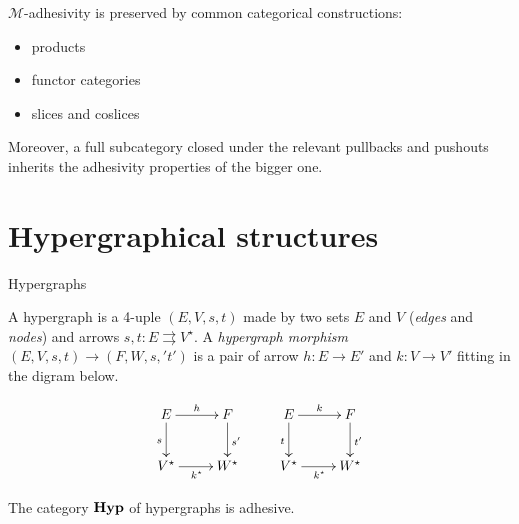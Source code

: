 \documentclass{beamer}
\newcommand{\catname}[1]{\textbf{\textup{#1}}}
\newcommand{\hyp}{\catname{Hyp}}
\begin{document}
\begin{frame}

$\mathcal{M}$-adhesivity is preserved by common categorical constructions:\pause
\begin{itemize}
	\item products\pause 
	\item functor categories \pause
	\item slices and coslices
\end{itemize}

\pause 

Moreover, a full subcategory closed under the relevant pullbacks and pushouts inherits the adhesivity properties of the bigger one.
\end{frame}


\section{Hypergraphical structures }


\begin{frame}{Hypergraphs}

A hypergraph is a 4-uple $(E, V, s, t)$ made by two sets $E$ and $V$ (\emph{edges} and \emph{nodes}) and arrows $s, t\colon E \rightrightarrows V^\star$. \pause A \emph{hypergraph morphism} $(E, V, s, t)\to (F, W, s,' t')$  is a pair of arrow $h\colon E\to E'$ and $k\colon V\to V'$ fitting in the digram below.
	
	\[\xymatrix{ E \ar[r]^{h}\ar[d]_{s}& F \ar[d]^{s'} & E \ar[r]^{k} \ar[d]_{t}& F\ar[d]^{t'}\\ V^\star\ar[r]_{k^\star}& W^\star & V^\star \ar[r]_{k^\star}&W^\star}\]
		
	\pause 
\begin{theorem}
	The category $\hyp$ of hypergraphs is adhesive.
\end{theorem}	

\end{frame}
\end{document}

